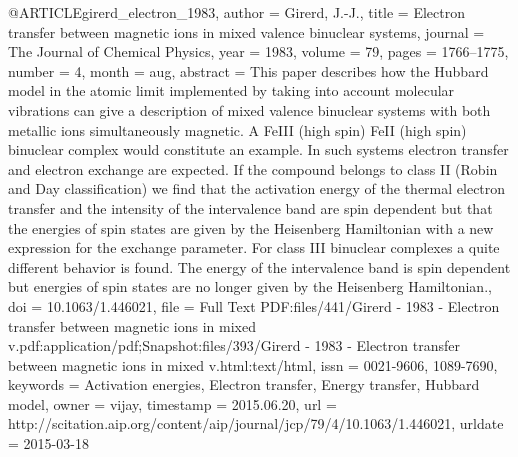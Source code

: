 @ARTICLE{girerd_electron_1983,
  author = {Girerd, J.-J.},
  title = {Electron transfer between magnetic ions in mixed valence binuclear
	systems},
  journal = {The Journal of Chemical Physics},
  year = {1983},
  volume = {79},
  pages = {1766--1775},
  number = {4},
  month = aug,
  abstract = {This paper describes how the Hubbard model in the atomic limit implemented
	by taking into account molecular vibrations can give a description
	of mixed valence binuclear systems with both metallic ions simultaneously
	magnetic. A FeIII (high spin) FeII (high spin) binuclear complex
	would constitute an example. In such systems electron transfer and
	electron exchange are expected. If the compound belongs to class
	II (Robin and Day classification) we find that the activation energy
	of the thermal electron transfer and the intensity of the intervalence
	band are spin dependent but that the energies of spin states are
	given by the Heisenberg Hamiltonian with a new expression for the
	exchange parameter. For class III binuclear complexes a quite different
	behavior is found. The energy of the intervalence band is spin dependent
	but energies of spin states are no longer given by the Heisenberg
	Hamiltonian.},
  doi = {10.1063/1.446021},
  file = {Full Text PDF:files/441/Girerd - 1983 - Electron transfer between magnetic ions in mixed v.pdf:application/pdf;Snapshot:files/393/Girerd - 1983 - Electron transfer between magnetic ions in mixed v.html:text/html},
  issn = {0021-9606, 1089-7690},
  keywords = {Activation energies, Electron transfer, Energy transfer, Hubbard model},
  owner = {vijay},
  timestamp = {2015.06.20},
  url = {http://scitation.aip.org/content/aip/journal/jcp/79/4/10.1063/1.446021},
  urldate = {2015-03-18}
}

